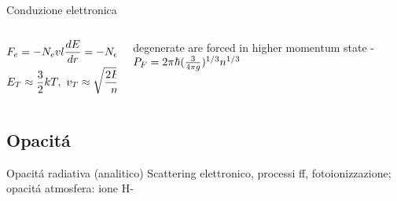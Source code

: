 \begin{frame}{Conduzione elettronica}
\begin{columns}[T]
\begin{column}{0.5\textwidth}
	\begin{align*}
	&F_e=-N_evl\TDy{r}{E}=-N_ekvl\TDy{r}{T}\\
	&E_T\approx\frac{3}{2}kT,\ v_T\approx\sqrt{\frac{2E_T}{m}}
	\end{align*}
\end{column}
\begin{column}{0.5\textwidth}
	\Pelectron degenerate are forced in higher momentum state - $P_F=2\pi\hbar(\frac{3}{4\pi g})\expy{1/3}n\expy{1/3}$
\end{column}
\end{columns}
\end{frame}

\subsection{Opacit\'a}

\begin{frame}{Opacit\'a radiativa (analitico)}
Scattering elettronico, processi ff, fotoionizzazione; opacit\'a atmosfera: ione H-
\end{frame}


